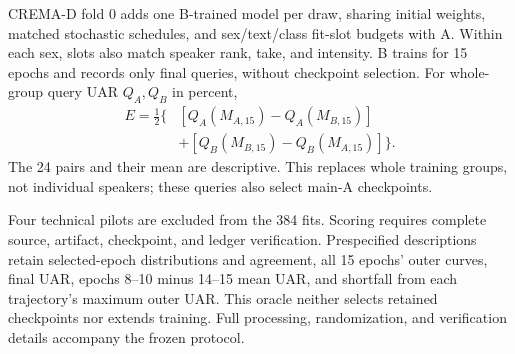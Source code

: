 CREMA-D fold 0 adds one B-trained model per draw, sharing initial weights,
matched stochastic schedules, and sex/text/class fit-slot budgets with A.
Within each sex, slots also match speaker rank, take, and intensity.
B trains for 15 epochs and records only final queries, without checkpoint
selection. For whole-group query UAR $Q_A,Q_B$ in percent,
\begin{equation}
\begin{aligned}
E=\tfrac12\{&[Q_A(M_{A,15})-Q_A(M_{B,15})]\\
&+[Q_B(M_{B,15})-Q_B(M_{A,15})]\}.
\end{aligned}
\end{equation}
The 24 pairs and their mean are descriptive. This replaces whole training
groups, not individual speakers; these queries also select main-A
checkpoints.

Four technical pilots are excluded from the 384 fits. Scoring requires
complete source, artifact, checkpoint, and ledger verification. Prespecified
descriptions retain selected-epoch distributions and agreement, all
15 epochs' outer curves, final UAR, epochs 8--10 minus 14--15 mean UAR,
and shortfall from each trajectory's maximum outer UAR. This oracle
neither selects retained checkpoints nor extends training. Full processing,
randomization, and verification details accompany the frozen protocol.
